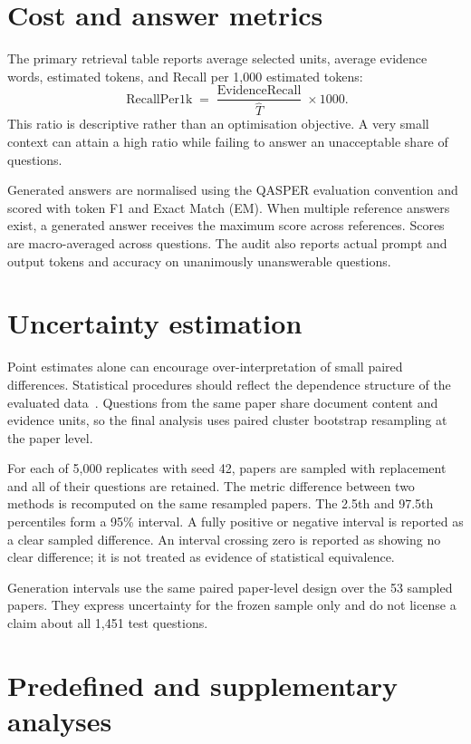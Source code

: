 \section{Cost and answer metrics}

The primary retrieval table reports average selected units, average evidence words, estimated tokens, and Recall per 1,000 estimated tokens:
\begin{equation}
    \operatorname{RecallPer1k}=\frac{\operatorname{EvidenceRecall}}{\widehat{T}}\times 1000.
\end{equation}
This ratio is descriptive rather than an optimisation objective. A very small context can attain a high ratio while failing to answer an unacceptable share of questions.

Generated answers are normalised using the QASPER evaluation convention and scored with token F1 and Exact Match (EM). When multiple reference answers exist, a generated answer receives the maximum score across references. Scores are macro-averaged across questions. The audit also reports actual prompt and output tokens and accuracy on unanimously unanswerable questions.

\section{Uncertainty estimation}

Point estimates alone can encourage over-interpretation of small paired differences. Statistical procedures should reflect the dependence structure of the evaluated data~\cite{dror2018significance}. Questions from the same paper share document content and evidence units, so the final analysis uses paired cluster bootstrap resampling at the paper level.

For each of 5,000 replicates with seed 42, papers are sampled with replacement and all of their questions are retained. The metric difference between two methods is recomputed on the same resampled papers. The 2.5th and 97.5th percentiles form a 95\% interval. A fully positive or negative interval is reported as a clear sampled difference. An interval crossing zero is reported as showing no clear difference; it is not treated as evidence of statistical equivalence.

Generation intervals use the same paired paper-level design over the 53 sampled papers. They express uncertainty for the frozen sample only and do not license a claim about all 1,451 test questions.

\section{Predefined and supplementary analyses}

